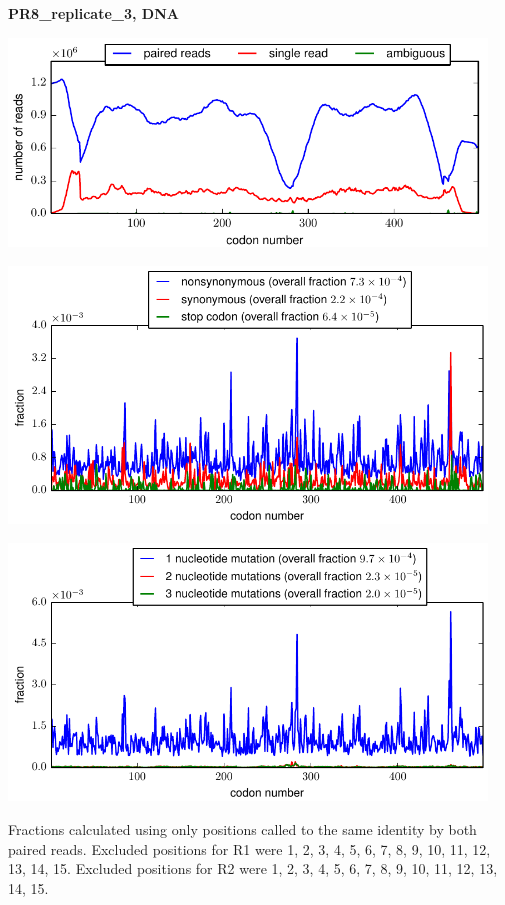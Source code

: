 \documentclass[10pt,letterpaper]{article}
\begin{document}
\centerline{\Large \bf PR8\_replicate\_3, DNA}
\vspace{0.1in}

\centerline{\includegraphics[width=5in]{PR8_replicate_3_DNA_codondepth.pdf}}
\vspace{0.1in}

\centerline{\includegraphics[width=5in]{PR8_replicate_3_DNA_syn-ns-dist.pdf}}
\vspace{0.1in}

\centerline{\includegraphics[width=5in]{PR8_replicate_3_DNA_nmutspercodon-dist.pdf}}
\vspace{0.1in}

Fractions calculated using only positions called to the same identity by both paired reads.  Excluded positions for R1 were 1, 2, 3, 4, 5, 6, 7, 8, 9, 10, 11, 12, 13, 14, 15. 
 Excluded positions for R2 were 1, 2, 3, 4, 5, 6, 7, 8, 9, 10, 11, 12, 13, 14, 15. 
\end{document}

